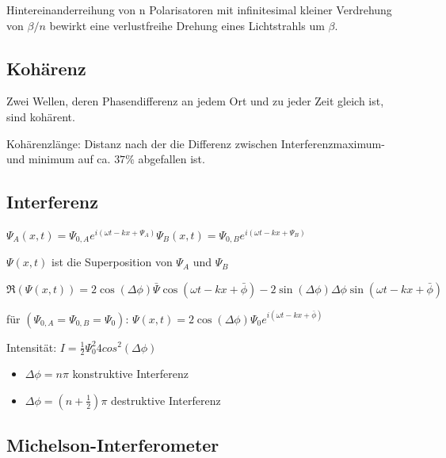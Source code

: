 \documentclass[10pt,a4paper]{scrartcl}
\begin{document}
\begin{multicols*}{3}
	Hintereinanderreihung von n Polarisatoren mit infinitesimal kleiner Verdrehung von $\beta/n$ bewirkt eine verlustfreihe Drehung eines Lichtstrahls um $\beta$.	
	
	\subsection{Kohärenz}
	
	Zwei Wellen, deren Phasendifferenz an jedem Ort und zu jeder Zeit gleich ist, sind kohärent.
	
	Kohärenzlänge: Distanz nach der die Differenz zwischen Interferenzmaximum- und minimum auf ca. $37\%$ abgefallen ist.
	
	\subsection{Interferenz}
	
	$\Psi_A(x,t) = \Psi_{0,A}e^{i(\omega t-kx+\Psi_A)}$\hfill$\Psi_B(x,t)=\Psi_{0,B}e^{i(\omega t-kx+\Psi_B)}$
	
	$\Psi(x,t)$ ist die Superposition von $\Psi_A$ und $\Psi_B$
	
	
	$\Re(\Psi(x,t))=2\cos(\Delta\phi)\bar{\Psi}\cos(\omega t-kx+\bar{\phi})-2\sin(\Delta\phi)\Delta\phi \sin(\omega t-kx+\bar{\phi})$
	
	für $(\Psi_{0,A}=\Psi_{0,B}=\Psi_0)$: \hfill $\Psi(x,t)=2\cos(\Delta\phi)\Psi_0e^{i(\omega t-kx+\bar{\phi})}$
	
	Intensität: $I = \frac{1}{2}\Psi_0^2 4cos^2(\Delta\phi)$
	
	\begin{itemize}
	\compaq
	\item
	$\Delta\phi=n\pi$ \hfill konstruktive Interferenz
	\item	
	$\Delta\phi=(n+\frac{1}{2})\pi$ \hfill destruktive Interferenz
	\end{itemize}
	
	\subsection{Michelson-Interferometer}
	
	

\end{multicols*}
\end{document}
